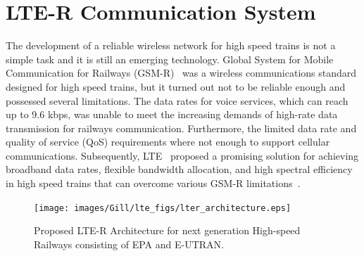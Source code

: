 \section{LTE-R Communication System}

The development of a reliable wireless network for high speed trains is not a simple task and it is still an emerging technology. Global System for Mobile Communication for Railways (GSM-R)~\cite{trlter1} was a wireless communications standard designed for high speed trains, but it turned out not to be reliable enough and possessed several limitations. The data rates for voice services, which can reach up to 9.6 kbps, was unable to meet the increasing demands of high-rate data transmission for railways communication. Furthermore, the limited data rate and quality of service (QoS) requirements where not enough to support cellular communications. Subsequently, LTE~\cite{trlter2} proposed a promising solution for achieving broadband data rates, flexible bandwidth allocation, and high spectral efficiency in high speed trains that can overcome various GSM-R limitations~\cite{arlter3,inplter4}.

\begin{figure}[!ht]
\centering
\texttt{[image: images/Gill/lte\_figs/lter\_architecture.eps]} 
\caption{Proposed LTE-R Architecture for next generation High-speed Railways consisting of EPA and E-UTRAN.}
\label{ltearch}
\end{figure}

